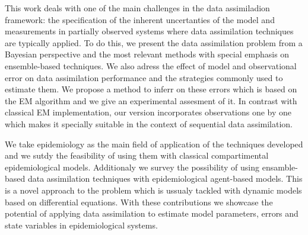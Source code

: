 \documentclass[
11pt, %
spanish, %
singlespacing, %
toctotoc, %
headsepline, %
chapterinoneline, %
]{MastersDoctoralThesis} %
\begin{document}
\begin{extraAbstract}

    This work deals with one of the main challenges in the data assimiladion framework: the specification of the inherent uncertanties of the model  and measurements in partially observed systems where data assimilation techniques are typically applied. To do this, we present the data assimilation problem from a Bayesian perspective and the most relevant methods with special emphasis on ensemble-based techniques. We also adress the effect of model and observational error on data assimilation performance and the strategies commonly used to estimate them. We propose a method to inferr on these errors which is based on the EM algorithm and we give an experimental assesment of it. In contrast with classical EM implementation, our version incorporates observations one by one which makes it specially suitable in the context of sequential data assimilation.

    We take epidemiology as the main field of application of the techniques developed and we sutdy the feasibility of using them with classical compartimental epidemiological models. Additionaly we survey the possibility of using ensamble-based data assimilation techniques with epidemiological agent-based models. This is a novel approach to the problem which is ussualy tackled with dynamic models based on differential equations. With these contributions we showcase the potential of applying data assimilation to estimate model parameters, errors and state variables in epidemiological systems.

\end{extraAbstract}




\end{document}
